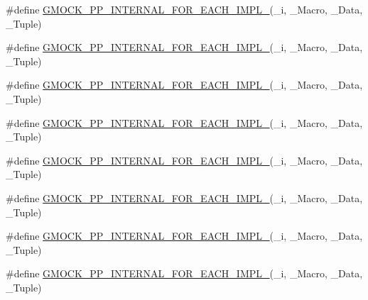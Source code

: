 \begin{DoxyCompactItemize}
\item 
\#define \mbox{\hyperlink{googletest-master_2googlemock_2include_2gmock_2internal_2gmock-pp_8h_ac8edd023c5a089a51b8ec78a12a37941}{G\+M\+O\+C\+K\+\_\+\+P\+P\+\_\+\+I\+N\+T\+E\+R\+N\+A\+L\+\_\+\+F\+O\+R\+\_\+\+E\+A\+C\+H\+\_\+\+I\+M\+P\+L\+\_}}(\+\_\+i,  \+\_\+\+Macro,  \+\_\+\+Data,  \+\_\+\+Tuple)
\item 
\#define \mbox{\hyperlink{googletest-master_2googlemock_2include_2gmock_2internal_2gmock-pp_8h_a3a7b6250eb5ceec84c604088b69f88ca}{G\+M\+O\+C\+K\+\_\+\+P\+P\+\_\+\+I\+N\+T\+E\+R\+N\+A\+L\+\_\+\+F\+O\+R\+\_\+\+E\+A\+C\+H\+\_\+\+I\+M\+P\+L\+\_}}(\+\_\+i,  \+\_\+\+Macro,  \+\_\+\+Data,  \+\_\+\+Tuple)
\item 
\#define \mbox{\hyperlink{googletest-master_2googlemock_2include_2gmock_2internal_2gmock-pp_8h_a8a0eb9f1389af438da01467e915fce2c}{G\+M\+O\+C\+K\+\_\+\+P\+P\+\_\+\+I\+N\+T\+E\+R\+N\+A\+L\+\_\+\+F\+O\+R\+\_\+\+E\+A\+C\+H\+\_\+\+I\+M\+P\+L\+\_}}(\+\_\+i,  \+\_\+\+Macro,  \+\_\+\+Data,  \+\_\+\+Tuple)
\item 
\#define \mbox{\hyperlink{googletest-master_2googlemock_2include_2gmock_2internal_2gmock-pp_8h_aff9ac7a5d231f8dac30c8436fffb887e}{G\+M\+O\+C\+K\+\_\+\+P\+P\+\_\+\+I\+N\+T\+E\+R\+N\+A\+L\+\_\+\+F\+O\+R\+\_\+\+E\+A\+C\+H\+\_\+\+I\+M\+P\+L\+\_}}(\+\_\+i,  \+\_\+\+Macro,  \+\_\+\+Data,  \+\_\+\+Tuple)
\item 
\#define \mbox{\hyperlink{googletest-master_2googlemock_2include_2gmock_2internal_2gmock-pp_8h_affbf923847bedeff0e6b2a7c33f63ff8}{G\+M\+O\+C\+K\+\_\+\+P\+P\+\_\+\+I\+N\+T\+E\+R\+N\+A\+L\+\_\+\+F\+O\+R\+\_\+\+E\+A\+C\+H\+\_\+\+I\+M\+P\+L\+\_}}(\+\_\+i,  \+\_\+\+Macro,  \+\_\+\+Data,  \+\_\+\+Tuple)
\item 
\#define \mbox{\hyperlink{googletest-master_2googlemock_2include_2gmock_2internal_2gmock-pp_8h_a07acbb7a6546c3c8e3f4f6c037831c54}{G\+M\+O\+C\+K\+\_\+\+P\+P\+\_\+\+I\+N\+T\+E\+R\+N\+A\+L\+\_\+\+F\+O\+R\+\_\+\+E\+A\+C\+H\+\_\+\+I\+M\+P\+L\+\_}}(\+\_\+i,  \+\_\+\+Macro,  \+\_\+\+Data,  \+\_\+\+Tuple)
\item 
\#define \mbox{\hyperlink{googletest-master_2googlemock_2include_2gmock_2internal_2gmock-pp_8h_ae6a832612f7db9940c60e2551343f697}{G\+M\+O\+C\+K\+\_\+\+P\+P\+\_\+\+I\+N\+T\+E\+R\+N\+A\+L\+\_\+\+F\+O\+R\+\_\+\+E\+A\+C\+H\+\_\+\+I\+M\+P\+L\+\_}}(\+\_\+i,  \+\_\+\+Macro,  \+\_\+\+Data,  \+\_\+\+Tuple)
\item 
\#define \mbox{\hyperlink{googletest-master_2googlemock_2include_2gmock_2internal_2gmock-pp_8h_a5f357dfae141ba984eec9f8e1ceb0bb7}{G\+M\+O\+C\+K\+\_\+\+P\+P\+\_\+\+I\+N\+T\+E\+R\+N\+A\+L\+\_\+\+F\+O\+R\+\_\+\+E\+A\+C\+H\+\_\+\+I\+M\+P\+L\+\_}}(\+\_\+i,  \+\_\+\+Macro,  \+\_\+\+Data,  \+\_\+\+Tuple)

\end{DoxyCompactItemize}
